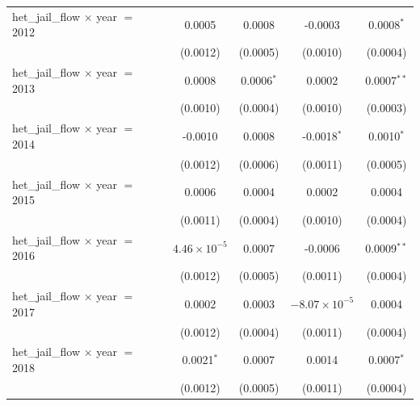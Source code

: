 \begin{tabular}{lcccc}
   het\_jail\_flow $\times$ year $=$ 2012                & 0.0005                 & 0.0008                    & -0.0003                & 0.0008$^{*}$\\   
                                                         & (0.0012)               & (0.0005)                  & (0.0010)               & (0.0004)\\   
   het\_jail\_flow $\times$ year $=$ 2013                & 0.0008                 & 0.0006$^{*}$              & 0.0002                 & 0.0007$^{**}$\\   
                                                         & (0.0010)               & (0.0004)                  & (0.0010)               & (0.0003)\\   
   het\_jail\_flow $\times$ year $=$ 2014                & -0.0010                & 0.0008                    & -0.0018$^{*}$          & 0.0010$^{*}$\\   
                                                         & (0.0012)               & (0.0006)                  & (0.0011)               & (0.0005)\\   
   het\_jail\_flow $\times$ year $=$ 2015                & 0.0006                 & 0.0004                    & 0.0002                 & 0.0004\\   
                                                         & (0.0011)               & (0.0004)                  & (0.0010)               & (0.0004)\\   
   het\_jail\_flow $\times$ year $=$ 2016                & $4.46\times 10^{-5}$   & 0.0007                    & -0.0006                & 0.0009$^{**}$\\   
                                                         & (0.0012)               & (0.0005)                  & (0.0011)               & (0.0004)\\   
   het\_jail\_flow $\times$ year $=$ 2017                & 0.0002                 & 0.0003                    & $-8.07\times 10^{-5}$  & 0.0004\\   
                                                         & (0.0012)               & (0.0004)                  & (0.0011)               & (0.0004)\\   
   het\_jail\_flow $\times$ year $=$ 2018                & 0.0021$^{*}$           & 0.0007                    & 0.0014                 & 0.0007$^{*}$\\   
                                                         & (0.0012)               & (0.0005)                  & (0.0011)               & (0.0004)\\   

\end{tabular}
